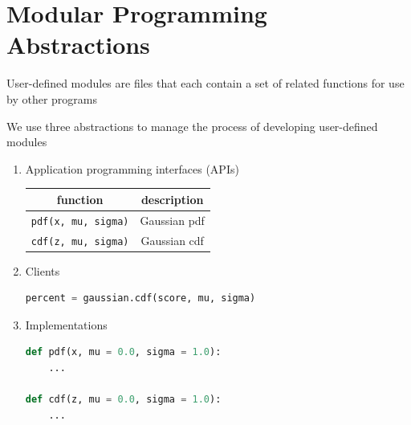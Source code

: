 \documentclass[8pt,a4paper,compress]{beamer}
\begin{document}
\section{Modular Programming Abstractions}
\begin{frame}[fragile]
\pause
User-defined modules are files that each contain a set of related functions for use by other programs

\pause
\bigskip

We use three abstractions to manage the process of developing user-defined modules
\begin{enumerate}
\pause
\item Application programming interfaces (APIs)
\begin{center}
\begin{tabular}{cc}
function & description \\ \hline
\lstinline$pdf(x, mu, sigma)$ & Gaussian pdf \\
\lstinline$cdf(z, mu, sigma)$ & Gaussian cdf \\
\end{tabular} 
\end{center}

\pause
\item Clients
\begin{lstlisting}[language=Python,style=focusin]
percent = gaussian.cdf(score, mu, sigma)
\end{lstlisting}

\pause
\item Implementations
\begin{lstlisting}[language=Python,style=focusin]
def pdf(x, mu = 0.0, sigma = 1.0):
    ...
    
def cdf(z, mu = 0.0, sigma = 1.0):
    ...
\end{lstlisting}
\end{enumerate}
\end{frame}
\end{document}
